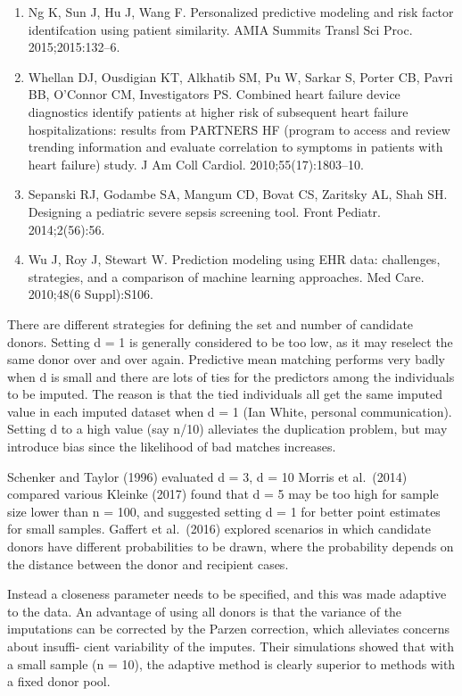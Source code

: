 \documentclass{article}
\providecommand{\tightlist}{%
  \setlength{\itemsep}{0pt}\setlength{\parskip}{0pt}}
\begin{document}
\begin{enumerate}
\def\labelenumi{\arabic{enumi}.}
\setcounter{enumi}{7}
\tightlist
\item
  Ng K, Sun J, Hu J, Wang F. Personalized predictive modeling and risk
  factor identifcation using patient similarity. AMIA Summits Transl Sci
  Proc. 2015;2015:132--6.
\item
  Whellan DJ, Ousdigian KT, Alkhatib SM, Pu W, Sarkar S, Porter CB,
  Pavri BB, O'Connor CM, Investigators PS. Combined heart failure device
  diagnostics identify patients at higher risk of subsequent heart
  failure hospitalizations: results from PARTNERS HF (program to access
  and review trending information and evaluate correlation to symptoms
  in patients with heart failure) study. J Am Coll Cardiol.
  2010;55(17):1803--10.
\item
  Sepanski RJ, Godambe SA, Mangum CD, Bovat CS, Zaritsky AL, Shah SH.
  Designing a pediatric severe sepsis screening tool. Front Pediatr.
  2014;2(56):56.
\item
  Wu J, Roy J, Stewart W. Prediction modeling using EHR data:
  challenges, strategies, and a comparison of machine learning
  approaches. Med Care. 2010;48(6 Suppl):S106.
\end{enumerate}

There are different strategies for defining the set and number of
candidate donors. Setting d = 1 is generally considered to be too low,
as it may reselect the same donor over and over again. Predictive mean
matching performs very badly when d is small and there are lots of ties
for the predictors among the individuals to be imputed. The reason is
that the tied individuals all get the same imputed value in each imputed
dataset when d = 1 (Ian White, personal communication). Setting d to a
high value (say n/10) alleviates the duplication problem, but may
introduce bias since the likelihood of bad matches increases.

Schenker and Taylor (1996) evaluated d = 3, d = 10 Morris et al.~(2014)
compared various Kleinke (2017) found that d = 5 may be too high for
sample size lower than n = 100, and suggested setting d = 1 for better
point estimates for small samples. Gaffert et al.~(2016) explored
scenarios in which candidate donors have different probabilities to be
drawn, where the probability depends on the distance between the donor
and recipient cases.

Instead a closeness parameter needs to be specified, and this was made
adaptive to the data. An advantage of using all donors is that the
variance of the imputations can be corrected by the Parzen correction,
which alleviates concerns about insuffi- cient variability of the
imputes. Their simulations showed that with a small sample (n = 10), the
adaptive method is clearly superior to methods with a fixed donor pool.
\end{document}
